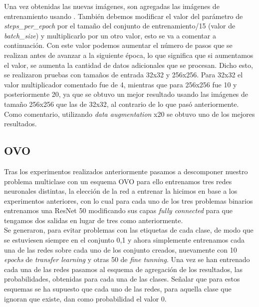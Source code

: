 Una vez obtenidas las nuevas imágenes, son agregadas las imágenes de entrenamiento usando . También debemos modificar el valor del parámetro de \textit{steps\_per\_epoch} por el tamaño del conjunto de entrenamiento/15 (valor de \textit{batch\_size}) y multiplicarlo por un otro valor, esto se va a comentar a continuación. Con este valor podemos aumentar el número de pasos que se realizan antes de avanzar a la siguiente época, lo que significa que si aumentamos el valor, se aumenta la cantidad de datos adicionales que se procesan. Dicho esto, se realizaron pruebas con tamaños de entrada 32x32 y 256x256. Para 32x32 el valor multiplicador comentado fue de 4, mientras que para 256x256 fue 10 y posteriormente 20, ya que se obtuvo un mejor resultado usando las imágenes de tamaño 256x256 que las de 32x32, al contrario de lo que pasó anteriormente. Como comentario, utilizando \textit{data augmentation} x20 se obtuvo uno de los mejores resultados.



























\subsection{OVO}

Tras los experimentos realizados anteriormente pasamos a descomponer nuestro problema multiclase con un esquema OVO para ello entrenamos tres redes neuronales distintas, la elección de la red a entrenar la hicimos en base a los experimentos anteriores, con lo cual para cada uno de los tres problemas binarios entrenamos una ResNet 50 modificando sus capas \textit{fully connected} para que tengamos dos salidas en lugar de tres como anteriormente.\\

Se generaron, para evitar problemas con las etiquetas de cada clase, de modo que se estuviesen siempre en el conjunto {0,1} y ahora simplemente entrenamos cada una de las redes sobre cada uno de los conjunto creados, nuevamente con 10 \textit{epochs} de \textit{transfer learning} y otras 50 de \textit{fine tunning}. Una vez se han entrenado cada una de las redes pasamos al esquema de agregación de los resultados, las probabilidades, obtenidas para cada una de las clases. Señalar que para estos esquemas se ha supuesto que cada uno de las redes, para aquella clase que ignoran que existe, dan como probabilidad el valor 0.\\

